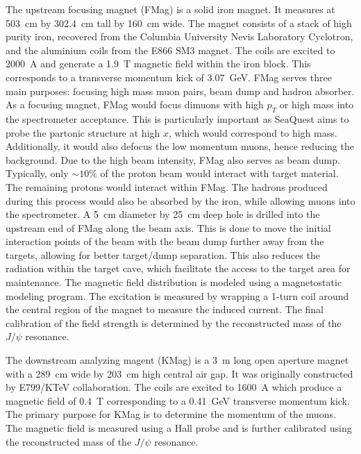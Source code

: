 \documentclass[../main.tex]{subfiles}
\begin{document}
The upstream focusing magnet (FMag) is a solid iron magnet. It measures at \SI{503}{\cm}
by \SI{302.4}{\cm} tall by \SI{160}{\cm} wide.
The magnet consists of a stack of high purity iron, recovered from
the Columbia University Nevis Laboratory Cyclotron, and the aluminium coils from the E866
SM3 magnet. The coils are excited to \SI{2000}{\ampere} and generate a \SI{1.9}{\tesla}
magnetic field within the iron block. This corresponds to a transverse momentum kick of
\SI{3.07}{\GeV}. FMag serves three main purposes: focusing high mass muon pairs, beam
dump and hadron absorber. As a focusing magnet, FMag would focus dimuons with high $p_T$
or high mass into the spectrometer acceptance. This is particularly important as SeaQuest
aims to probe the partonic structure at high $x$, which would correspond to high mass.
Additionally, it would also defocus the low momentum muons, hence reducing the background.
Due to the high beam intensity, FMag also serves as beam dump. Typically, only $\sim 10\%$
of the proton beam would interact with target material. The remaining protons would interact
within FMag. The hadrons produced during this process would also be absorbed by the iron,
while allowing muons into the spectrometer.
A \SI{5}{\cm} diameter by \SI{25}{\cm} deep hole is drilled into the upstream
end of FMag along the beam axis. This is done to move the initial interaction points
of the beam with the beam dump further away from the targets, allowing for better target/dump
separation. This also reduces the radiation within the target cave, which facilitate the
access to the target area for maintenance.
The magnetic field distribution is modeled using a magnetostatic modeling program. The
excitation is measured by wrapping a 1-turn coil around the central region of the magnet to measure the induced
current. The final calibration of the field strength is determined by the reconstructed
mass of the $J/\psi$ resonance.

The downstream analyzing magent (KMag) is a \SI{3}{\meter} long open aperture magnet
with a \SI{289}{\cm} wide by \SI{203}{\cm} high central air gap. It was
originally  constructed by E799/KTeV collaboration.
The coils are excited to \SI{1600}{\ampere} which produce a magnetic field of \SI{0.4}{\tesla}
corresponding to a \SI{0.41}{\GeV} transverse momentum kick. The primary purpose for
KMag is to determine the momentum of the muons. The magnetic field is measured using a Hall
probe and is further calibrated using the reconstructed mass of the $J/\psi$ resonance.
\end{document}
